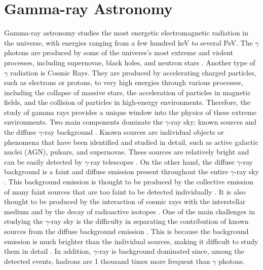 \section{Gamma-ray Astronomy}
\label{s:Gamma-Ray-Astronomy}
Gamma-ray astronomy studies the most energetic electromagnetic radiation in the universe, with energies ranging from a few hundred keV to several PeV. The $\gamma$ photons are produced by some of the universe's most extreme and violent processes, including supernovae, black holes, and neutron stars \cite{Fishman1995}. Another type of $\gamma$ radiation is Cosmic Rays. They are produced by accelerating charged particles, such as electrons or protons, to very high energies through various processes, including the collapse of massive stars, the acceleration of particles in magnetic fields, and the collision of particles in high-energy environments. Therefore, the study of gamma rays provides a unique window into the physics of these extreme environments.
Two main components dominate the $\gamma$-ray sky: known sources and the diffuse $\gamma$-ray background \cite{Ackermann2015}. Known sources are individual objects or phenomena that have been identified and studied in detail, such as active galactic nuclei (AGN), pulsars, and supernovae. These sources are relatively bright and can be easily detected by $\gamma$-ray telescopes \cite{Abdo2010}.
On the other hand, the diffuse $\gamma$-ray background is a faint and diffuse emission present throughout the entire $\gamma$-ray sky \cite{Ackermann2015}. This background emission is thought to be produced by the collective emission of many faint sources that are too faint to be detected individually \cite{Abdo2010}. It is also thought to be produced by the interaction of cosmic rays with the interstellar medium and by the decay of radioactive isotopes \cite{bulgarelli_2019}.
One of the main challenges in studying the $\gamma$-ray sky is the difficulty in separating the contribution of known sources from the diffuse background emission \cite{Ackermann2015}. This is because the background emission is much brighter than the individual sources, making it difficult to study them in detail \cite{Abdo2010}. In addition, $\gamma$-ray is background dominated since, among the detected events, hadrons are 1 thousand times more frequent than $\gamma$ photons.
